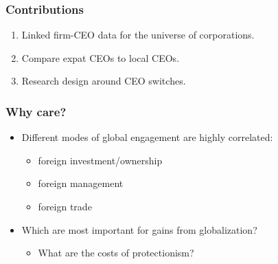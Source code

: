 \documentclass[aspectratio=43,compress,mathserif]{beamer}
\newcounter{ora}
\begin{document}
\begin{frame}\frametitle{Contributions}\hypertarget{Contributions}{}
\begin{enumerate}\setcounter{enumi}{0}
\item Linked firm-CEO data for the universe of corporations.

\item Compare expat CEOs to local CEOs.

\item Research design around CEO switches.


\end{enumerate}
\end{frame}



\begin{frame}\frametitle{Why care?}\hypertarget{Why care?}{}
\begin{itemize}
\item Different modes of global engagement are highly correlated:
\begin{itemize}
\item foreign investment/ownership

\item foreign management

\item foreign trade
\end{itemize}

\item Which are most important for gains from globalization?
\begin{itemize}
\item What are the costs of protectionism?


\end{itemize}







\end{itemize}
\end{frame}
\end{document}
